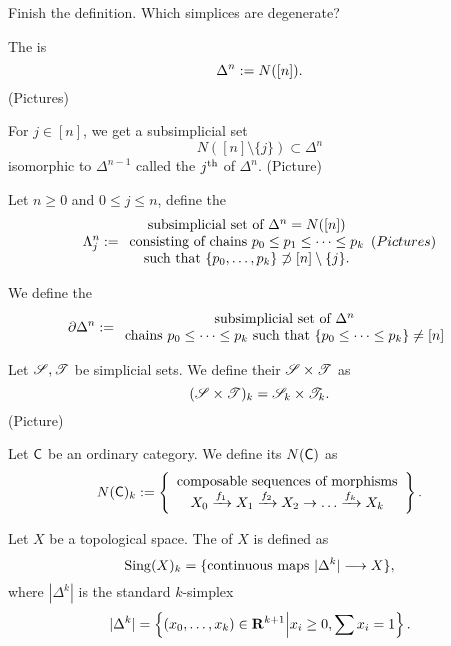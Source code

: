 \begin{exercise}
	Finish the definition. Which simplices are degenerate?
\end{exercise}
\begin{example}
	The  is
	\[
		\Delta^{n} := N([n]).
	\] 
	(Pictures)
\end{example}
\begin{note}
	For $j\in [n]$, we get a subsimplicial set
	\[
		N([n]\setminus \{j\} ) \subset \Delta^{n}
	\] 
	isomorphic to $\Delta^{n-1}$ called the $j^\text{th}$  of $\Delta^{n}$. (Picture)
\end{note}
\begin{example}[Horns]
	Let $n\ge 0$ and $0\le j\le n$, define the 
	\[
		\Lambda^{n}_j := \begin{array}{c}
			\text{subsimplicial set of }\Delta^{n} = N([n]) \\
			\text{consisting of chains }p_0\le p_1\le \dots\le p_k \\
			\text{such that } \{p_0,\dots,p_k\} \not\supset [n] \setminus \{j\} . 
		\end{array}
		(Pictures)
	\] 
\end{example}
\begin{example}
	We define the 
	\[
		\partial \Delta^{n} := \begin{array}{c}
			\text{subsimplicial set of }\Delta^{n} \\
			\text{chains }p_0\le \dots \le p_k\text{ such that }\{p_0\le \dots\le p_k\} \neq [n]
		\end{array}
	\] 
\end{example}
\begin{example}[Products]
	Let $\mathscr S,\mathscr T$ be simplicial sets. We define their  $\mathscr S\times \mathscr T$ as
	\[
		(\mathscr S\times \mathscr T)_k = \mathscr S_k \times \mathscr T_k.
	\] 
	(Picture)
\end{example}
\begin{example}
	Let $\mathsf{C}$ be an ordinary category. We define its  $N(\mathsf{C})$ as
	\[
		N(\C)_k \defeq \left\{ \begin{array}{c}
			\text{composable sequences of morphisms} \\
			X_0 \xrightarrow{f_1} X_1\xrightarrow{f_2}X_2\to \dots\xrightarrow{f_k} X_k
		\end{array}\right\} . 
	\] 
\end{example}
\begin{example}
	Let $X$ be a topological space. The  of $X$ is defined as
	\[
	\Sing(X)_k = \{\text{continuous maps }|\Delta^{k}|\to X\} ,
	\] 
	where $|\Delta^{k}|$ is the standard $k$-simplex
	\[
		|\Delta^{k}| = \left\{ (x_0,\dots,x_k)\in \mathbf{R}^{k+1} \middle| x_i\ge 0, \sum x_i=1 \right\} .
	\] 
\end{example}
